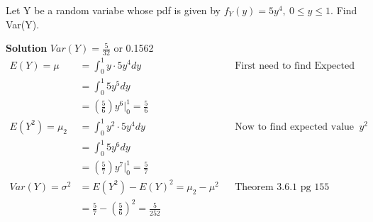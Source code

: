 \documentclass[12pt]{article}
\newenvironment{problem}[2][Problem]{\begin{trivlist}
\item[\hskip \labelsep {\bfseries #1}\hskip \labelsep {\bfseries #2.}]}{\end{trivlist}}
\begin{document}
\begin{problem}{3.6.10}Let Y be a random variabe whose pdf is given by $f_Y(y) = 5y^4, \ 0 \leq y \leq 1$. Find Var(Y). 

\textbf{Solution} $Var(Y) = \frac{5}{32} $ or 0.1562
\begin{align*}
E(Y) = \mu &= \int_0^1 y \cdot 5y^4 dy  && \text{First need to find Expected value of y}\\
&= \int_0^1 5y^5 dy\\
&= (\frac{5}{6})y^6 \Big|_0^1 = \frac{5}{6}\\
E(Y^2) = \mu_2 &= \int_0^1 y^2 \cdot 5y^4 dy && \text{Now to find expected value of $y^2$} \\
&= \int_0^1 5y^6 dy \\
&= (\frac{5}{7})y^7 \Big|_0^1 = \frac{5}{7} \\
Var(Y)  = \sigma^2 &= E(Y^2)-E(Y)^2 = \mu_2 - \mu^2  && \text{Theorem 3.6.1 pg 155} \\
&= \frac{5}{7} - (\frac{5}{6})^2 = \frac{5}{252}
\end{align*}
\end{problem}
\end{document}
